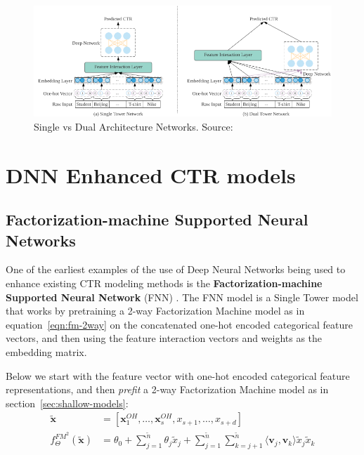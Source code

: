 \documentclass{mldsmsc}
\begin{document}
\begin{figure}[h]
    \centering
    \includegraphics[width=\textwidth]{../figures/single_dual_dnn.png}
    \caption{Single vs Dual Architecture Networks. Source: \citep{RefWorks:zhang2021deep}}
    \label{fig:single-dual-models}
\end{figure}

\section{DNN Enhanced CTR models}
\label{sec:mlp-enhanced-models}

\subsection{Factorization-machine Supported Neural Networks}

One of the earliest examples of the use of Deep Neural Networks being used to enhance existing
CTR modeling methods is the \textbf{Factorization-machine Supported Neural Network} (FNN)
\citep{RefWorks:zhang2016deep}. The FNN model is a Single Tower model that works by pretraining
a 2-way Factorization Machine model as in equation~\ref{eqn:fm-2way} on the concatenated
one-hot encoded categorical feature vectors, and then using the feature interaction vectors and
weights as the embedding matrix.

Below we start with the feature vector with one-hot encoded categorical feature representations, and then \emph{prefit}
a 2-way Factorization Machine model as in section~\ref{sec:shallow-models}:
\begin{align*}
    \tilde{\mathbf{x}} &= \left[\mathbf{x}_1^{OH}, \ldots, \mathbf{x}_s^{OH},  x_{s+1}, \ldots, x_{s+d}\right]\\
    f_{\Theta}^{FM^2}(\tilde{\mathbf{x}} ) &= \theta_0 + \sum_{j=1}^{\tilde{n}} \theta_j \tilde{x}_j +
    \sum_{j=1}^{\tilde{n}} \sum_{k=j+1}^{\tilde{n}}
    \langle \mathbf{v}_j, \mathbf{v}_k \rangle \tilde{x}_j \tilde{x}_k
\end{align*}
\end{document}
